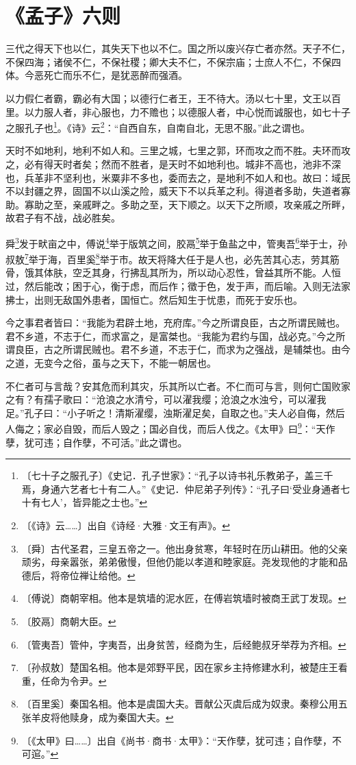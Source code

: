 \documentclass[12pt,UTF-8,openany,a4]{ctexbook}
\begin{document}
\chapter{《孟子》六则}

\begin{large}
    
    三代之得天下也以仁，其失天下也以不仁。国之所以废兴存亡者亦然。天子不仁，不保四海；诸侯不仁，不保社稷；卿大夫不仁，不保宗庙；士庶人不仁，不保四体。今恶死亡而乐不仁，是犹恶醉而强酒。
    
    以力假仁者霸，霸必有大国；以德行仁者王，王不待大。汤以七十里，文王以百里。以力服人者，非心服也，力不赡也；以德服人者，中心悦而诚服也，如七十子之服孔子也\footnote{〔七十子之服孔子〕\yiwen 《史记．孔子世家》：“孔子以诗书礼乐教弟子，盖三千焉，身通六艺者七十有二人。”《史记．仲尼弟子列传》：“孔子曰‘受业身通者七十有七人’，皆异能之士也。”}。《诗》云\footnote{〔《诗》云……〕\yiwen 出自《诗经·大雅·文王有声》。}：“自西自东，自南自北，无思不服。”此之谓也。
    
    天时不如地利，地利不如人和。三里之城，七里之郭，环而攻之而不胜。夫环而攻之，必有得天时者矣；然而不胜者，是天时不如地利也。城非不高也，池非不深也，兵革非不坚利也，米粟非不多也，委而去之，是地利不如人和也。故曰：域民不以封疆之界，固国不以山溪之险，威天下不以兵革之利。得道者多助，失道者寡助。寡助之至，亲戚畔之。多助之至，天下顺之。以天下之所顺，攻亲戚之所畔，故君子有不战，战必胜矣。
    
    舜\footnote{〔舜〕\yiwen 古代圣君，三皇五帝之一。他出身贫寒，年轻时在历山耕田。他的父亲顽劣，母亲嚣张，弟弟傲慢，但他仍能以孝道和睦家庭。尧发现他的才能和品德后，将帝位禅让给他。}发于畎亩之中，傅说\footnote{〔傅说〕\yiwen 商朝宰相。他本是筑墙的泥水匠，在傅岩筑墙时被商王武丁发现。}举于版筑之间，胶鬲\footnote{〔胶鬲〕\yiwen 商朝大臣。}举于鱼盐之中，管夷吾\footnote{〔管夷吾〕\yiwen 管仲，字夷吾，出身贫苦，经商为生，后经鲍叔牙举荐为齐相。}举于士，孙叔敖\footnote{〔孙叔敖〕\yiwen 楚国名相。他本是郊野平民，因在家乡主持修建水利，被楚庄王看重，任命为令尹。}举于海，百里奚\footnote{〔百里奚〕\yiwen 秦国名相。他本是虞国大夫。晋献公灭虞后成为奴隶。秦穆公用五张羊皮将他赎身，成为秦国大夫。}举于市。故天将降大任于是人也，必先苦其心志，劳其筋骨，饿其体肤，空乏其身，行拂乱其所为，所以动心忍性，曾益其所不能。人恒过，然后能改；困于心，衡于虑，而后作；徵于色，发于声，而后喻。入则无法家拂士，出则无敌国外患者，国恒亡。然后知生于忧患，而死于安乐也。
    
    今之事君者皆曰：“我能为君辟土地，充府库。”今之所谓良臣，古之所谓民贼也。君不乡道，不志于仁，而求富之，是富桀也。“我能为君约与国，战必克。”今之所谓良臣，古之所谓民贼也。君不乡道，不志于仁，而求为之强战，是辅桀也。由今之道，无变今之俗，虽与之天下，不能一朝居也。
    
    不仁者可与言哉？安其危而利其灾，乐其所以亡者。不仁而可与言，则何亡国败家之有？有孺子歌曰：“沧浪之水清兮，可以濯我缨；沧浪之水浊兮，可以濯我足。”孔子曰：“小子听之！清斯濯缨，浊斯濯足矣，自取之也。”夫人必自侮，然后人侮之；家必自毁，而后人毁之；国必自伐，而后人伐之。《太甲》曰\footnote{〔《太甲》曰……〕\yiwen 出自《尚书·商书·太甲》：“天作孽，犹可违；自作孽，不可逭。”}：“天作孽，犹可违；自作孽，不可活。”此之谓也。
\end{large}
\end{document}
